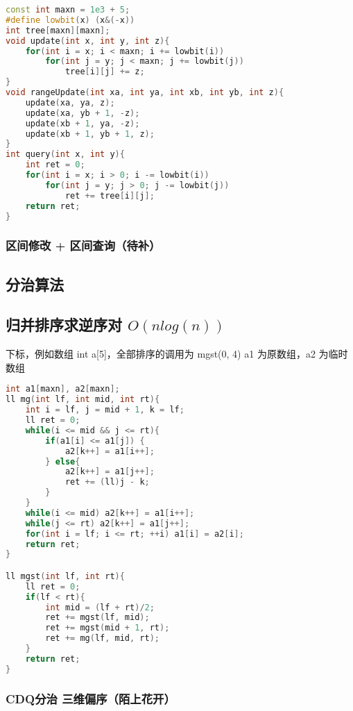 \begin{lstlisting}[language=C++]
const int maxn = 1e3 + 5;
#define lowbit(x) (x&(-x))
int tree[maxn][maxn];
void update(int x, int y, int z){
    for(int i = x; i < maxn; i += lowbit(i))
        for(int j = y; j < maxn; j += lowbit(j))
            tree[i][j] += z;
}
void rangeUpdate(int xa, int ya, int xb, int yb, int z){
    update(xa, ya, z);
    update(xa, yb + 1, -z);
    update(xb + 1, ya, -z);
    update(xb + 1, yb + 1, z);
}
int query(int x, int y){
    int ret = 0;
    for(int i = x; i > 0; i -= lowbit(i))
        for(int j = y; j > 0; j -= lowbit(j))
            ret += tree[i][j];
    return ret;
}
\end{lstlisting}

\subsubsection{区间修改 + 区间查询（待补）}

\subsection{分治算法}

\subsection{归并排序求逆序对 $O(nlog(n))$ }

下标，例如数组 int a[5]，全部排序的调用为 mgst(0, 4)
a1 为原数组，a2 为临时数组

\begin{lstlisting}[language=C++]
int a1[maxn], a2[maxn];
ll mg(int lf, int mid, int rt){
    int i = lf, j = mid + 1, k = lf;
    ll ret = 0;
    while(i <= mid && j <= rt){
        if(a1[i] <= a1[j]) {
            a2[k++] = a1[i++];
        } else{
            a2[k++] = a1[j++];
            ret += (ll)j - k;
        }
    }
    while(i <= mid) a2[k++] = a1[i++];
    while(j <= rt) a2[k++] = a1[j++];
    for(int i = lf; i <= rt; ++i) a1[i] = a2[i];
    return ret;
}

ll mgst(int lf, int rt){
    ll ret = 0;
    if(lf < rt){
        int mid = (lf + rt)/2;
        ret += mgst(lf, mid);
        ret += mgst(mid + 1, rt);
        ret += mg(lf, mid, rt);
    }
    return ret;
}        
\end{lstlisting}

\subsubsection{CDQ分治 三维偏序（陌上花开）}

